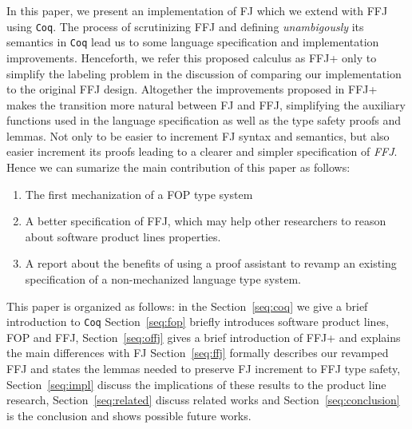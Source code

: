 In this paper, we present an implementation of \ac{FJ} which we extend with \ac{FFJ} using \texttt{Coq}.
The process of scrutinizing \ac{FFJ} and defining \textit{unambigously} its semantics in \texttt{Coq} 
lead us to some language specification and implementation improvements. 
Henceforth, we refer this proposed calculus as \ac{FFJ+} only to simplify the
labeling problem in the discussion of comparing our implementation to the original \ac{FFJ} design.
Altogether the improvements proposed in \ac{FFJ+} makes the transition more natural between \ac{FJ} and \ac{FFJ}, 
simplifying the auxiliary functions used in the language specification as well as the type safety proofs and lemmas. 
Not only to be easier to increment \ac{FJ} syntax and semantics, 
but also easier increment its proofs leading to a clearer and simpler specification of \textit{FFJ}.
Hence we can sumarize the main contribution of this paper as follows:
\begin{enumerate}
    \item The first mechanization of a FOP type system
    \item A better specification of FFJ, which may help other researchers to reason about software product lines properties.
    \item A report about the benefits of using a proof assistant 
    to revamp an existing specification of a non-mechanized language type system.
\end{enumerate}

This paper is organized as follows: in the Section~\ref{seq:coq} we give a brief introduction to \texttt{Coq} 
Section~\ref{seq:fop} briefly introduces software product lines, \ac{FOP} and \ac{FFJ},
Section~\ref{seq:offj} gives a brief introduction of  \ac{FFJ+} and explains the main differences with \ac{FJ}
Section~\ref{seq:ffj} formally describes our revamped \ac{FFJ} and states the lemmas needed to preserve \ac{FJ} increment to \ac{FFJ} type safety, 
Section~\ref{seq:impl} discuss the implications of these results to the product line research,
Section~\ref{seq:related} discuss related works and
Section~\ref{seq:conclusion} is the conclusion and shows possible future works.
